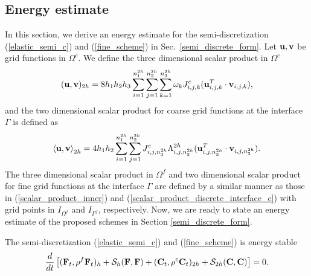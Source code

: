 \subsection{Energy estimate}\label{sec_energy}
In this section, we derive an energy estimate for the semi-discretization (\ref{elastic_semi_c}) and (\ref{fine_scheme}) in Sec.~\ref{semi_discrete_form}. Let ${\bf u}, {\bf v}$ be grid functions in $\Omega^c$. We define the three dimensional scalar product in $\Omega^c$
\begin{equation}\label{scalar_product_inner}
({\bf u}, {\bf v})_{2h} = 8h_1h_2h_3\sum_{i=1}^{n_1^{2h}}\sum_{j=1}^{n_2^{2h}}\sum_{k=1}^{n_3^{2h}}\omega_k{J}_{i,j,k}^{c}({\bf u}_{i,j,k}^T\cdot {\bf v}_{i,j,k}),
\end{equation}
and the two dimensional scalar product for coarse grid functions at the interface $\Gamma$ is defined as 
\begin{equation}\label{scalar_product_discrete_interface_c}
\left<{\bf u}, {\bf v}\right>_{2h} = 4h_1h_2\sum_{i=1}^{n_1^{2h}}\sum_{j=1}^{n_2^{2h}}{  J}_{i,j,n_3^{2h}}^{c}\Lambda^{2h}_{i,j,n_3^{2h}}({\bf u}_{i,j,n_3^{2h}}^T\cdot {\bf v}_{i,j,n_3^{2h}}).
\end{equation}
The three dimensional scalar product in $\Omega^f$ and two dimensional scalar product for fine grid functions at the interface $\Gamma$ are defined by a similar manner as those in (\ref{scalar_product_inner}) and (\ref{scalar_product_discrete_interface_c}) with grid points in $I_{\Omega^f}$ and $I_{\Gamma^f}$, respectively. Now, we are ready to state an energy estimate of the proposed schemes in Section \ref{semi_discrete_form}. 
 \begin{theorem}
  The semi-discretization (\ref{elastic_semi_c}) and (\ref{fine_scheme}) is energy stable 
  \[
  \frac{d}{dt}\left[({\bf F}_t,\rho^f {\bf F}_t)_{h} + \mathcal{S}_{h}({\bf F},{\bf F}) + ({\bf C}_t,\rho^{c} {\bf C}_t)_{2h} + \mathcal{S}_{2h}({\bf C},{\bf C}) \right]   = 0.
  \]
 \end{theorem}
